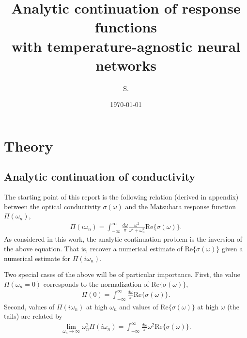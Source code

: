 \documentclass[notitlepage,11pt,nofootinbib]{revtex4-1}
\begin{document}
\title{\bf Analytic continuation of response functions\\with temperature-agnostic neural networks}
\author{S. }
\date{\today}

\begin{abstract}

\end{abstract}

\maketitle
\vspace{-.5cm}
\tableofcontents

\section{Theory}

\subsection{Analytic continuation of conductivity}

The starting point of this report is the following relation (derived in appendix) between the optical conductivity $\sigma(\omega)$ and the Matsubara response function $\Pi(\omega_n)$,
\begin{align}
\Pi(i\omega_n) 
=
\int_{-\infty}^{\infty} \frac{d\omega}{\pi} \frac{\omega^2}{\omega^2+\omega_n^2}
\text{Re}\{ \sigma(\omega) \}.
\label{Pi_continuation}
\end{align}
As considered in this work, the analytic continuation problem is the inversion of the above equation. That is, recover a numerical estimate of $\text{Re}\{ \sigma(\omega) \}$ given a numerical estimate for $\Pi(i\omega_n)$.


Two special cases of the above will be of particular importance. First, the value $\Pi(\omega_n=0)$ corresponds to the normalization of $\text{Re}\{ \sigma(\omega) \}$,
\begin{align}
\Pi(0) 
=
\int_{-\infty}^{\infty} \frac{d\omega}{\pi}
\text{Re}\{ \sigma(\omega) \}.
\label{Pi_normalization}
\end{align}
Second, values of $\Pi(i\omega_n)$ at high $\omega_n$ and values of $\text{Re}\{ \sigma(\omega) \}$ at high $\omega$ (the tails) are related by
\begin{align}
\lim_{\omega_n\rightarrow\infty}
\omega_n^2
\Pi(i\omega_n)
=
\int_{-\infty}^{\infty} \frac{d\omega}{\pi}\omega^2 
\text{Re}\{ \sigma(\omega) \}.
\label{Pi_moment}
\end{align}
\end{document}
